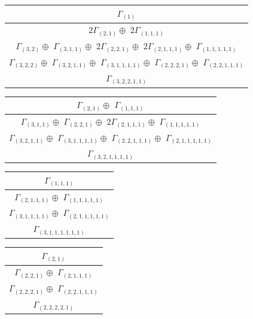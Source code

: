 \documentclass[main.tex]{subfiles}
\begin{document}
\bigskip
\begin{minipage}{.5\textwidth}
\centering
\begin{tabular}{c}
$\Gamma_{(
1
)}$
\\ \hline
$2\Gamma_{(
2 , 
1
)} \oplus$
$2\Gamma_{(
1 , 
1 , 
1
)}$
\\ \hline
$\Gamma_{(
3 , 
2
)} \oplus$
$\Gamma_{(
3 , 
1 , 
1
)} \oplus$
$2\Gamma_{(
2 , 
2 , 
1
)} \oplus$
$2\Gamma_{(
2 , 
1 , 
1 , 
1
)} \oplus$
$\Gamma_{(
1 , 
1 , 
1 , 
1 , 
1
)}$
\\ \hline
$\Gamma_{(
3 , 
2 , 
2
)} \oplus$
$\Gamma_{(
3 , 
2 , 
1 , 
1
)} \oplus$
$\Gamma_{(
3 , 
1 , 
1 , 
1 , 
1
)} \oplus$
$\Gamma_{(
2 , 
2 , 
2 , 
1
)} \oplus$
$\Gamma_{(
2 , 
2 , 
1 , 
1 , 
1
)}$
\\ \hline
$\Gamma_{(
3 , 
2 , 
2 , 
1 , 
1
)}$
\\
\end{tabular}\end{minipage}
\begin{minipage}{.6\textwidth}
\centering
\begin{tabular}{c}
$\Gamma_{(
2 , 
1
)} \oplus$
$\Gamma_{(
1 , 
1 , 
1
)}$
\\ \hline
$\Gamma_{(
3 , 
1 , 
1
)} \oplus$
$\Gamma_{(
2 , 
2 , 
1
)} \oplus$
$2\Gamma_{(
2 , 
1 , 
1 , 
1
)} \oplus$
$\Gamma_{(
1 , 
1 , 
1 , 
1 , 
1
)}$
\\ \hline
$\Gamma_{(
3 , 
2 , 
1 , 
1
)} \oplus$
$\Gamma_{(
3 , 
1 , 
1 , 
1 , 
1
)} \oplus$
$\Gamma_{(
2 , 
2 , 
1 , 
1 , 
1
)} \oplus$
$\Gamma_{(
2 , 
1 , 
1 , 
1 , 
1 , 
1
)}$
\\ \hline
$\Gamma_{(
3 , 
2 , 
1 , 
1 , 
1 , 
1
)}$
\\
\end{tabular}\end{minipage}
\bigskip
\begin{minipage}{.3\textwidth}
\centering
\begin{tabular}{c}
$\Gamma_{(
1 , 
1 , 
1
)}$
\\ \hline
$\Gamma_{(
2 , 
1 , 
1 , 
1
)} \oplus$
$\Gamma_{(
1 , 
1 , 
1 , 
1 , 
1
)}$
\\ \hline
$\Gamma_{(
3 , 
1 , 
1 , 
1 , 
1
)} \oplus$
$\Gamma_{(
2 , 
1 , 
1 , 
1 , 
1 , 
1
)}$
\\ \hline
$\Gamma_{(
3 , 
1 , 
1 , 
1 , 
1 , 
1 , 
1
)}$
\\
\end{tabular}\end{minipage}
\begin{minipage}{.3\textwidth}
\centering
\begin{tabular}{c}
$\Gamma_{(
2 , 
1
)}$
\\ \hline
$\Gamma_{(
2 , 
2 , 
1
)} \oplus$
$\Gamma_{(
2 , 
1 , 
1 , 
1
)}$
\\ \hline
$\Gamma_{(
2 , 
2 , 
2 , 
1
)} \oplus$
$\Gamma_{(
2 , 
2 , 
1 , 
1 , 
1
)}$
\\ \hline
$\Gamma_{(
2 , 
2 , 
2 , 
2 , 
1
)}$
\\
\end{tabular}\end{minipage}
\end{document}
